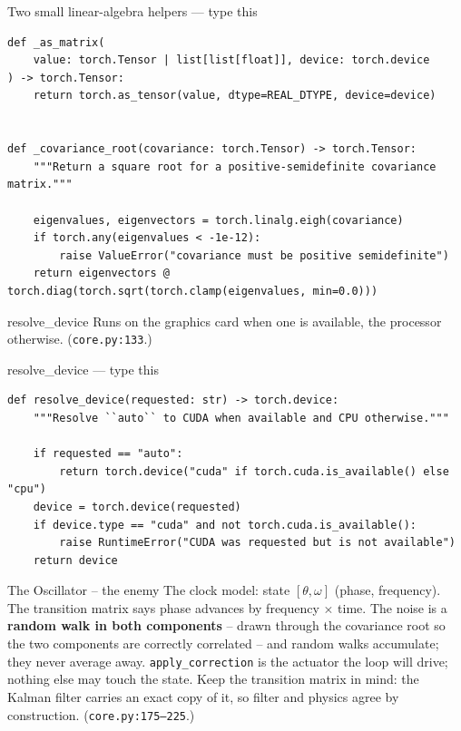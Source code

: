 \documentclass[10pt]{beamer}
\begin{document}
\begin{frame}[fragile]{Two small linear-algebra helpers --- type this}
\begin{lstlisting}[basicstyle=\ttfamily\tiny]
def _as_matrix(
    value: torch.Tensor | list[list[float]], device: torch.device
) -> torch.Tensor:
    return torch.as_tensor(value, dtype=REAL_DTYPE, device=device)


def _covariance_root(covariance: torch.Tensor) -> torch.Tensor:
    """Return a square root for a positive-semidefinite covariance matrix."""

    eigenvalues, eigenvectors = torch.linalg.eigh(covariance)
    if torch.any(eigenvalues < -1e-12):
        raise ValueError("covariance must be positive semidefinite")
    return eigenvectors @ torch.diag(torch.sqrt(torch.clamp(eigenvalues, min=0.0)))
\end{lstlisting}
\end{frame}

\begin{frame}{resolve\_device}
  Runs on the graphics card when one is available, the
  processor otherwise. (\texttt{core.py:133}.)
\end{frame}

\begin{frame}[fragile]{resolve\_device --- type this}
\begin{lstlisting}[basicstyle=\ttfamily\tiny]
def resolve_device(requested: str) -> torch.device:
    """Resolve ``auto`` to CUDA when available and CPU otherwise."""

    if requested == "auto":
        return torch.device("cuda" if torch.cuda.is_available() else "cpu")
    device = torch.device(requested)
    if device.type == "cuda" and not torch.cuda.is_available():
        raise RuntimeError("CUDA was requested but is not available")
    return device
\end{lstlisting}
\end{frame}

\begin{frame}{The Oscillator -- the enemy}
  The clock model: state $[\theta, \omega]$ (phase, frequency).
  The transition matrix says phase advances by frequency
  $\times$ time. The noise is a \textbf{random walk in both
  components} -- drawn through the covariance root so the two
  components are correctly correlated -- and random walks
  accumulate; they never average away. \texttt{apply\_correction}
  is the actuator the loop will drive; nothing else may touch
  the state. Keep the transition matrix in mind: the Kalman
  filter carries an exact copy of it, so filter and physics
  agree by construction. (\texttt{core.py:175--225}.)
\end{frame}
\end{document}
